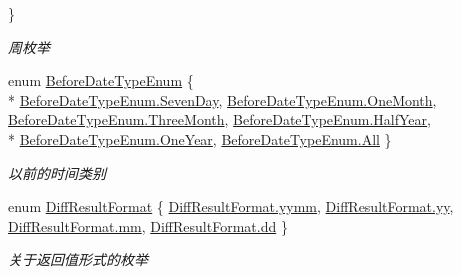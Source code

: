 \begin{DoxyCompactItemize}
 \}\begin{DoxyCompactList}\small\item\em 周枚举 \end{DoxyCompactList}
\item 
enum \hyperlink{class_x_c_l_net_tools_1_1_enum_1_1_common_enum_abac0e863746b7fb8e6364c17f61648ea}{Before\+Date\+Type\+Enum} \{ \\*
\hyperlink{class_x_c_l_net_tools_1_1_enum_1_1_common_enum_abac0e863746b7fb8e6364c17f61648eaa89cbb363380ec655e2457e3b8ed9bfbd}{Before\+Date\+Type\+Enum.\+Seven\+Day}, 
\hyperlink{class_x_c_l_net_tools_1_1_enum_1_1_common_enum_abac0e863746b7fb8e6364c17f61648eaafbf813f42cef34e971078c047da659f8}{Before\+Date\+Type\+Enum.\+One\+Month}, 
\hyperlink{class_x_c_l_net_tools_1_1_enum_1_1_common_enum_abac0e863746b7fb8e6364c17f61648eaacbfdf32b0a04388155151bd3e1606312}{Before\+Date\+Type\+Enum.\+Three\+Month}, 
\hyperlink{class_x_c_l_net_tools_1_1_enum_1_1_common_enum_abac0e863746b7fb8e6364c17f61648eaab718c33478a0f1c03a3e50a5bd46869e}{Before\+Date\+Type\+Enum.\+Half\+Year}, 
\\*
\hyperlink{class_x_c_l_net_tools_1_1_enum_1_1_common_enum_abac0e863746b7fb8e6364c17f61648eaae0e2407272c8d5ee6e131146067c7055}{Before\+Date\+Type\+Enum.\+One\+Year}, 
\hyperlink{class_x_c_l_net_tools_1_1_enum_1_1_common_enum_abac0e863746b7fb8e6364c17f61648eaab1c94ca2fbc3e78fc30069c8d0f01680}{Before\+Date\+Type\+Enum.\+All}
 \}\begin{DoxyCompactList}\small\item\em 以前的时间类别 \end{DoxyCompactList}
\item 
enum \hyperlink{class_x_c_l_net_tools_1_1_enum_1_1_common_enum_aaefa466811a65c8971576fcdb80354a4}{Diff\+Result\+Format} \{ \hyperlink{class_x_c_l_net_tools_1_1_enum_1_1_common_enum_aaefa466811a65c8971576fcdb80354a4a5db5c5d516e72790f7e16ba4f37edfdb}{Diff\+Result\+Format.\+yymm}, 
\hyperlink{class_x_c_l_net_tools_1_1_enum_1_1_common_enum_aaefa466811a65c8971576fcdb80354a4a2fb1c5cf58867b5bbc9a1b145a86f3a0}{Diff\+Result\+Format.\+yy}, 
\hyperlink{class_x_c_l_net_tools_1_1_enum_1_1_common_enum_aaefa466811a65c8971576fcdb80354a4ab3cd915d758008bd19d0f2428fbb354a}{Diff\+Result\+Format.\+mm}, 
\hyperlink{class_x_c_l_net_tools_1_1_enum_1_1_common_enum_aaefa466811a65c8971576fcdb80354a4a1aabac6d068eef6a7bad3fdf50a05cc8}{Diff\+Result\+Format.\+dd}
 \}\begin{DoxyCompactList}\small\item\em 关于返回值形式的枚举 \end{DoxyCompactList}

\end{DoxyCompactItemize}
